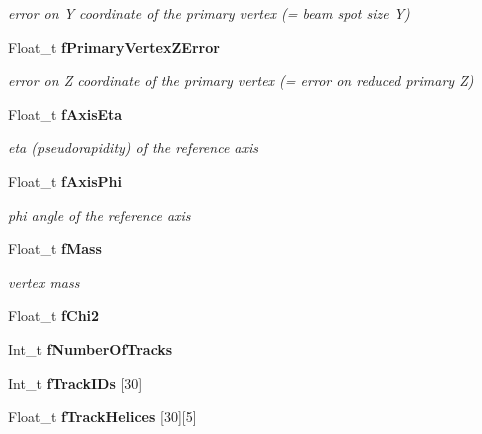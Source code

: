 \begin{CompactItemize}
\begin{CompactList}\small\item\em error on Y coordinate of the primary vertex (= beam spot size Y) \item\end{CompactList}\item 
Float\_\-t \bf{f\-Primary\-Vertex\-ZError}\label{classTVertex_d1ac0d03139f5f17dd472b87c76a8608}

\begin{CompactList}\small\item\em error on Z coordinate of the primary vertex (= error on reduced primary Z) \item\end{CompactList}\item 
Float\_\-t \bf{f\-Axis\-Eta}\label{classTVertex_8651dd5f72d0e1a93a16d3d2db6336f1}

\begin{CompactList}\small\item\em eta (pseudorapidity) of the reference axis \item\end{CompactList}\item 
Float\_\-t \bf{f\-Axis\-Phi}\label{classTVertex_fb2dffb6cf9b72b5bab8728dd7451c9c}

\begin{CompactList}\small\item\em phi angle of the reference axis \item\end{CompactList}\item 
Float\_\-t \bf{f\-Mass}\label{classTVertex_a303587bdbe889c4f19d6f75a863ced0}

\begin{CompactList}\small\item\em vertex mass \item\end{CompactList}\item 
Float\_\-t \textbf{f\-Chi2}\label{classTVertex_bba1f42089451fb79461540c52b9cc6d}

\item 
Int\_\-t \textbf{f\-Number\-Of\-Tracks}\label{classTVertex_456fc7dbafa4703c2e38d4d6335ec3a2}

\item 
Int\_\-t \textbf{f\-Track\-IDs} [30]\label{classTVertex_b8f411158223ebf9d697033dfa0d1f85}

\item 
Float\_\-t \textbf{f\-Track\-Helices} [30][5]\label{classTVertex_9d3aec3f9b9b8492cca149de68b93174}


\end{CompactItemize}
